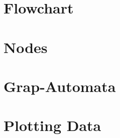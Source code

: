 \section{Flowchart}

\begin{center}
	
\end{center}

\section{Nodes}
\begin{center}
	
\end{center}

\newpage
\section{Grap-Automata}
\begin{figure}[h!]
	\begin{center}
		
	\end{center}
\end{figure}

\newpage
\section{Plotting Data}
\begin{figure}[ht]
	\begin{center}
		
	\end{center}
\end{figure}